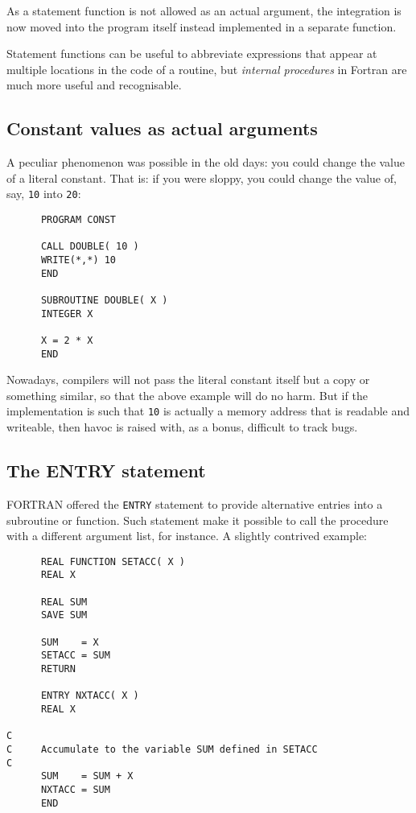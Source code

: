 As a statement function is not allowed as an actual argument, the integration
is now moved into the program itself instead implemented in a separate
function.

Statement functions can be useful to abbreviate expressions that appear at
multiple locations in the code of a routine, but \emph{internal procedures}
in Fortran are much more useful and recognisable.


\subsection{Constant values as actual arguments}
A peculiar phenomenon was possible in the old days: you could change the
value of a literal constant. That is: if you were sloppy, you could change the
value of, say, \verb+10+ into \verb+20+:
\begin{verbatim}
      PROGRAM CONST

      CALL DOUBLE( 10 )
      WRITE(*,*) 10
      END

      SUBROUTINE DOUBLE( X )
      INTEGER X

      X = 2 * X
      END
\end{verbatim}

Nowadays, compilers will not pass the literal constant itself but a copy or something similar, so that
the above example will do no harm. But if the implementation is such that \verb+10+
is actually a memory address that is readable and writeable, then havoc is raised with, as
a bonus, difficult to track bugs.


\subsection{The ENTRY statement}
FORTRAN offered the \verb+ENTRY+ statement to provide alternative entries into a subroutine or function.
Such statement make it possible to call the procedure with a different argument list, for instance.
A slightly contrived example:
\begin{verbatim}
      REAL FUNCTION SETACC( X )
      REAL X

      REAL SUM
      SAVE SUM

      SUM    = X
      SETACC = SUM
      RETURN

      ENTRY NXTACC( X )
      REAL X

C
C     Accumulate to the variable SUM defined in SETACC
C
      SUM    = SUM + X
      NXTACC = SUM
      END
\end{verbatim}


